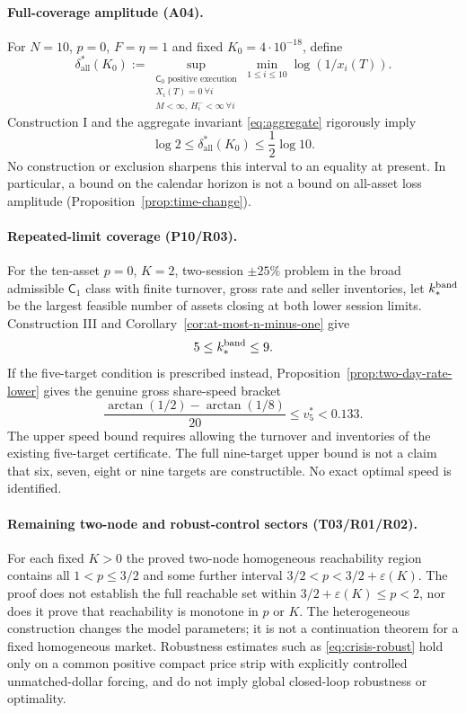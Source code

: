 \documentclass[review,hidelinks,onefignum,onetabnum]{siamonline250211}%
\begin{document}
\paragraph{Full-coverage amplitude (A04).}
For $N=10$, $p=0$, $F=\eta=1$ and fixed
$K_0=4\cdot10^{-18}$, define
\[
 \delta_{\mathrm{all}}^*(K_0):=
 \sup_{\substack{\mathsf C_0\text{ positive execution}\\
                   X_i(T)=0\ \forall i\\
                   M<\infty,\ H_i^-<\infty\ \forall i}}
 \min_{1\le i\le10}\log(1/x_i(T)).
\]
Construction I and the aggregate invariant
\eqref{eq:aggregate} rigorously imply
\begin{equation}\label{eq:open-all-bracket}
 \log2\le\delta_{\mathrm{all}}^*(K_0)
                \le\frac12\log10.
\end{equation}
No construction or exclusion sharpens this interval to
an equality at present. In particular, a bound on the
calendar horizon is not a bound on all-asset loss
amplitude (Proposition~\ref{prop:time-change}).

\paragraph{Repeated-limit coverage (P10/R03).}
For the ten-asset $p=0$, $K=2$, two-session
$\pm25\%$ problem in the broad admissible
$\mathsf C_1$ class with finite turnover, gross rate
and seller inventories, let $k_*^{\rm band}$ be the
largest feasible number of assets closing at
both lower session limits. Construction III and
Corollary~\ref{cor:at-most-n-minus-one} give
\begin{equation}\label{eq:open-coverage-bracket}
 5\le k_*^{\rm band}\le9.
\end{equation}
If the five-target condition is prescribed instead,
Proposition~\ref{prop:two-day-rate-lower} gives the
genuine gross share-speed bracket
\begin{equation}\label{eq:open-speed-bracket}
 \frac{\arctan(1/2)-\arctan(1/8)}{20}
 \le v_5^*<0.133.
\end{equation}
The upper speed bound requires allowing the turnover
and inventories of the existing five-target certificate.
The full nine-target upper bound is not a claim that
six, seven, eight or nine targets are constructible.
No exact optimal speed is identified.

\paragraph{Remaining two-node and robust-control sectors (T03/R01/R02).}
For each fixed $K>0$ the proved two-node homogeneous
reachability region contains all $1<p\le3/2$
and some further interval
$3/2<p<3/2+\varepsilon(K)$.
The proof does not establish the full reachable set
within $3/2+\varepsilon(K)\le p<2$, nor does it
prove that reachability is monotone in $p$ or $K$.
The heterogeneous construction changes the model
parameters; it is not a continuation theorem for a
fixed homogeneous market. Robustness estimates such
as \eqref{eq:crisis-robust} hold only on a common
positive compact price strip with explicitly controlled
unmatched-dollar forcing, and do not imply global
closed-loop robustness or optimality.
\end{document}
